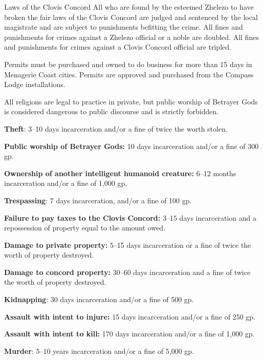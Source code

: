\documentclass[10pt,a4paper,twoside,bg=print,twocolumn,openany,nodeprecatedcode]{dndbook}
\begin{document}
\begin{DndSidebar}[float=!b]{Laws of the Clovis Concord}
All who are found by the esteemed Zhelezo to have broken the fair laws of the Clovis Concord are judged and sentenced by the local magistrate and are subject to punishments befitting the crime. All fines and punishments for crimes against a Zhelezo official or a noble are doubled. All fines and punishments for crimes against a Clovis Concord official are tripled.



Permits must be purchased and owned to do business for more than 15 days in Menagerie Coast cities. Permits are approved and purchased from the Compass Lodge installations.



All religions are legal to practice in private, but public worship of Betrayer Gods is considered dangerous to public discourse and is strictly forbidden.



\textbf{Theft}: 3–10 days incarceration and/or a fine of twice the worth stolen.



\textbf{Public worship of Betrayer Gods:} 10 days incarceration and/or a fine of 300 gp.



\textbf{Ownership of another intelligent humanoid creature:} 6–12 months incarceration and/or a fine of 1,000 gp.



\textbf{Trespassing}: 7 days incarceration, and/or a fine of 100 gp.



\textbf{Failure to pay taxes to the Clovis Concord:} 3–15 days incarceration and a repossession of property equal to the amount owed.



\textbf{Damage to private property:} 5–15 days incarceration or a fine of twice the worth of property destroyed.



\textbf{Damage to concord property:} 30–60 days incarceration and a fine of twice the worth of property destroyed.



\textbf{Kidnapping}: 30 days incarceration and/or a fine of 500 gp.



\textbf{Assault with intent to injure:} 15 days incarceration and/or a fine of 250 gp.



\textbf{Assault with intent to kill:} 170 days incarceration and/or a fine of 1,000 gp.



\textbf{Murder}: 5–10 years incarceration and/or a fine of 5,000 gp.



\end{DndSidebar}
\end{document}
